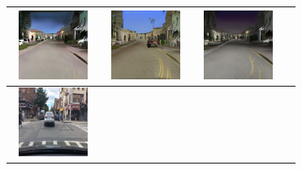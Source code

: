 \documentclass{VUMIFPSbakalaurinis}
\begin{document}
\begin{table}[H]
{\begin{tabular}{|c|c|c|c|}
            \includegraphics[width=100,height=85]{img/pvz/3_cycle} & \includegraphics[width=100,height=85]{img/pvz/3_cut} & \includegraphics[width=100,height=85]{img/pvz/3_mspc}
            \\
            \hline
            \includegraphics[width=100,height=85]{img/pvz/4_real} & 

\end{tabular}}
\end{table}
\end{document}
